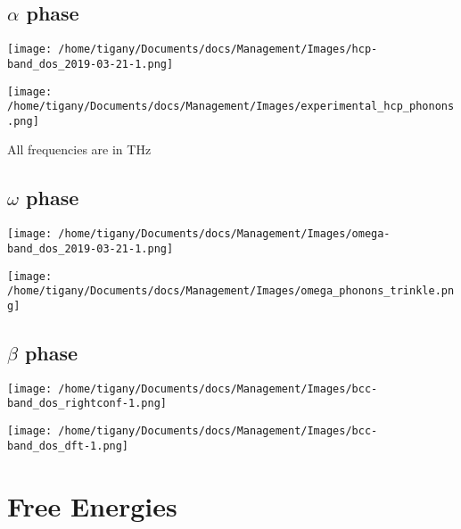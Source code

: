 \documentclass[11pt]{article}
\begin{document}
\subsection*{\(\alpha\) phase}
\label{sec:orge437f8a}
\begin{center}
\texttt{[image: /home/tigany/Documents/docs/Management/Images/hcp-band\_dos\_2019-03-21-1.png]}
\label{org78afb0b}
\end{center}

\begin{center}
\texttt{[image: /home/tigany/Documents/docs/Management/Images/experimental\_hcp\_phonons.png]}
\end{center}

\begin{notes}
All frequencies are in THz
\end{notes}

\subsection*{\(\omega\) phase}
\label{sec:org7faa9bd}
\begin{center}
\texttt{[image: /home/tigany/Documents/docs/Management/Images/omega-band\_dos\_2019-03-21-1.png]}
\label{orge287774}
\end{center}

\begin{center}
\texttt{[image: /home/tigany/Documents/docs/Management/Images/omega\_phonons\_trinkle.png]}
\end{center}


\subsection*{\(\beta\) phase}
\label{sec:org986085a}
\begin{center}
\texttt{[image: /home/tigany/Documents/docs/Management/Images/bcc-band\_dos\_rightconf-1.png]}
\label{org2dceba5}
\end{center}



\begin{center}
\texttt{[image: /home/tigany/Documents/docs/Management/Images/bcc-band\_dos\_dft-1.png]}
\end{center}
\section*{Free Energies}
\label{sec:org0aba707}
\end{document}
